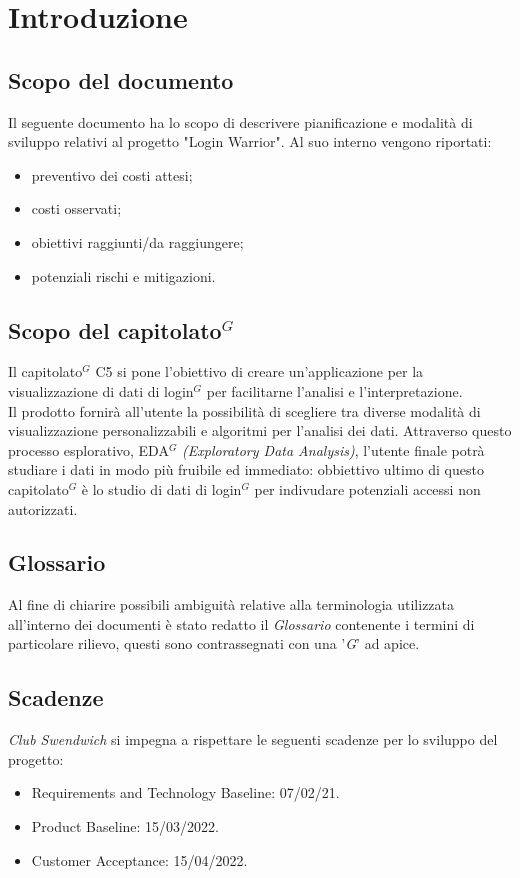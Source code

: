 \section{Introduzione}
\subsection{Scopo del documento}
Il seguente documento ha lo scopo di descrivere pianificazione e modalità di sviluppo relativi al progetto "Login Warrior".
Al suo interno vengono riportati:
\begin{itemize}
    \item preventivo dei costi attesi;
    \item costi osservati;
    \item obiettivi raggiunti/da raggiungere;
    \item potenziali rischi e mitigazioni.
\end{itemize}

\subsection{Scopo del capitolato$^G$ }
Il capitolato$^G$  C5 si pone l'obiettivo di creare un'applicazione per la visualizzazione di dati di login$^G$
per facilitarne l'analisi e l'interpretazione.\\
Il prodotto fornirà all'utente la possibilità di scegliere tra diverse
modalità di visualizzazione personalizzabili e algoritmi per l'analisi dei dati.
Attraverso questo processo esplorativo, EDA$^G$  \textit{(Exploratory Data Analysis)},
l'utente finale potrà studiare i dati in modo più fruibile ed immediato: obbiettivo ultimo
di questo capitolato$^G$  è lo studio di dati di login$^G$  per indivudare potenziali accessi non autorizzati.

\subsection{Glossario}
Al fine di chiarire possibili ambiguità relative alla terminologia utilizzata all'interno dei documenti è stato redatto il \textit{Glossario} contenente i termini di particolare rilievo,
questi sono contrassegnati con una '\textit{G}' ad apice.

\subsection{Scadenze}
\textit{Club Swendwich} si impegna a rispettare le seguenti scadenze per lo sviluppo del progetto:
\begin{itemize}
    \item Requirements and Technology Baseline: 07/02/21.
    \item Product Baseline: 15/03/2022.
    \item Customer Acceptance: 15/04/2022.
\end{itemize}